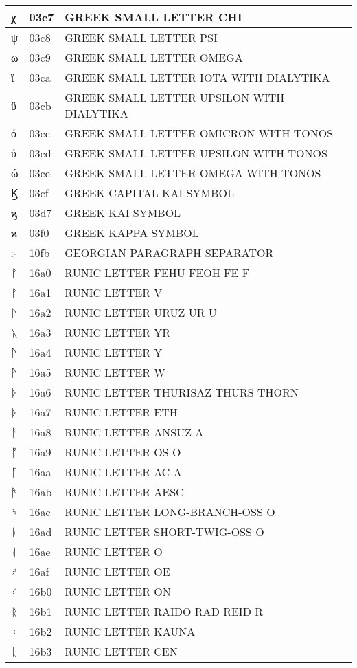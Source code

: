 \documentclass[12pt,letterpaper,openany]{book}
\begin{document}
\begin{center}
\begin{supertabular}{|m{0.25in}|m{0.5in}|m{4in}|}
χ & 03c7 & GREEK SMALL LETTER CHI\\\hline
ψ & 03c8 & GREEK SMALL LETTER PSI\\\hline
ω & 03c9 & GREEK SMALL LETTER OMEGA\\\hline
ϊ & 03ca & GREEK SMALL LETTER IOTA WITH DIALYTIKA\\\hline
ϋ & 03cb & GREEK SMALL LETTER UPSILON WITH DIALYTIKA\\\hline
ό & 03cc & GREEK SMALL LETTER OMICRON WITH TONOS\\\hline
ύ & 03cd & GREEK SMALL LETTER UPSILON WITH TONOS\\\hline
ώ & 03ce & GREEK SMALL LETTER OMEGA WITH TONOS\\\hline
Ϗ & 03cf & GREEK CAPITAL KAI SYMBOL\\\hline
ϗ & 03d7 & GREEK KAI SYMBOL\\\hline
ϰ & 03f0 & GREEK KAPPA SYMBOL\\\hline
჻ & 10fb & GEORGIAN PARAGRAPH SEPARATOR\\\hline
ᚠ & 16a0 & RUNIC LETTER FEHU FEOH FE F\\\hline
ᚡ & 16a1 & RUNIC LETTER V\\\hline
ᚢ & 16a2 & RUNIC LETTER URUZ UR U\\\hline
ᚣ & 16a3 & RUNIC LETTER YR\\\hline
ᚤ & 16a4 & RUNIC LETTER Y\\\hline
ᚥ & 16a5 & RUNIC LETTER W\\\hline
ᚦ & 16a6 & RUNIC LETTER THURISAZ THURS THORN\\\hline
ᚧ & 16a7 & RUNIC LETTER ETH\\\hline
ᚨ & 16a8 & RUNIC LETTER ANSUZ A\\\hline
ᚩ & 16a9 & RUNIC LETTER OS O\\\hline
ᚪ & 16aa & RUNIC LETTER AC A\\\hline
ᚫ & 16ab & RUNIC LETTER AESC\\\hline
ᚬ & 16ac & RUNIC LETTER LONG-BRANCH-OSS O\\\hline
ᚭ & 16ad & RUNIC LETTER SHORT-TWIG-OSS O\\\hline
ᚮ & 16ae & RUNIC LETTER O\\\hline
ᚯ & 16af & RUNIC LETTER OE\\\hline
ᚰ & 16b0 & RUNIC LETTER ON\\\hline
ᚱ & 16b1 & RUNIC LETTER RAIDO RAD REID R\\\hline
ᚲ & 16b2 & RUNIC LETTER KAUNA\\\hline
ᚳ & 16b3 & RUNIC LETTER CEN\\\hline

\end{supertabular}
\end{center}
\end{document}
